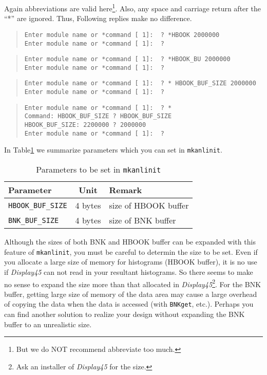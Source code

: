 Again abbreviations are valid here\footnote{
But we do NOT recommend abbreviate too much.
}.
Also,
any space and carriage return after the ``*'' are ignored.
Thus,
Following replies make no difference.

\begin{quote}\baselineskip 3.2mm\begin{verbatim}
Enter module name or *command [ 1]:  ? *HBOOK 2000000
Enter module name or *command [ 1]:  ?
\end{verbatim}\end{quote}
\begin{quote}\baselineskip 3.2mm\begin{verbatim}
Enter module name or *command [ 1]:  ? *HBOOK_BU 2000000
Enter module name or *command [ 1]:  ?
\end{verbatim}\end{quote}
\begin{quote}\baselineskip 3.2mm\begin{verbatim}
Enter module name or *command [ 1]:  ? * HBOOK_BUF_SIZE 2000000
Enter module name or *command [ 1]:  ?
\end{verbatim}\end{quote}
\begin{quote}\baselineskip 3.2mm\begin{verbatim}
Enter module name or *command [ 1]:  ? *
Command: HBOOK_BUF_SIZE ? HBOOK_BUF_SIZE
HBOOK_BUF_SIZE: 2200000 ? 2000000
Enter module name or *command [ 1]:  ?
\end{verbatim}\end{quote}

In Table\ref{tab:BNK-HBOOK-buffer}
we summarize parameters which you can set in {\tt mkanlinit}.

\begin{table}[htb]
\begin{center}
\begin{tabular}{|l|c|l|}
\hline
Parameter & Unit & Remark \\
\hline
{\tt HBOOK\_BUF\_SIZE} & 4 bytes & size of HBOOK buffer \\
{\tt BNK\_BUF\_SIZE}   & 4 bytes & size of BNK buffer \\
\hline
\end{tabular}
\end{center}
\caption{Parameters to be set in {\tt mkanlinit}}
\label{tab:BNK-HBOOK-buffer}
\end{table}

Although the sizes of both BNK and HBOOK buffer
can be expanded with this feature of {\tt mkanlinit},
you must be careful to determin the size to be set.
Even if you allocate a large size of memory for histograms (HBOOK buffer),
it is no use if {\em Display45} can not read in your resultant histograms.
So there seems to make no sense
to expand the size more than that allocated in {\em Display45}\footnote{
Ask an installer of {\em Display45} for the size.
}.
For the BNK buffer,
getting large size of memory of the data area may cause
a large overhead of copying the data when the data is accessed
(with {\tt BNKget}, etc.).
Perhaps you can find another solution to realize your design
without expanding the BNK buffer to an unrealistic size.

